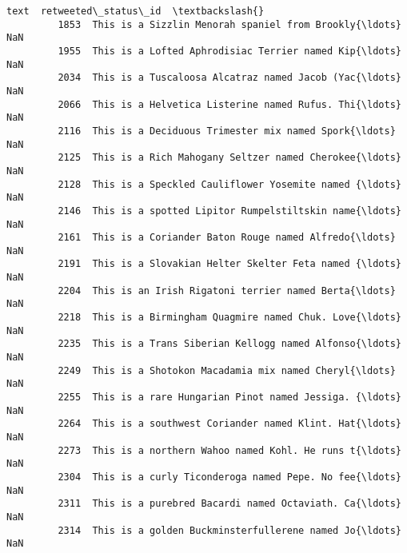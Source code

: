 \documentclass[11pt]{article}
\begin{document}
\begin{Verbatim}[commandchars=\\\{\}]
                                                            text  retweeted\_status\_id  \textbackslash{}
         1853  This is a Sizzlin Menorah spaniel from Brookly{\ldots}                  NaN   
         1955  This is a Lofted Aphrodisiac Terrier named Kip{\ldots}                  NaN   
         2034  This is a Tuscaloosa Alcatraz named Jacob (Yac{\ldots}                  NaN   
         2066  This is a Helvetica Listerine named Rufus. Thi{\ldots}                  NaN   
         2116  This is a Deciduous Trimester mix named Spork{\ldots}                  NaN   
         2125  This is a Rich Mahogany Seltzer named Cherokee{\ldots}                  NaN   
         2128  This is a Speckled Cauliflower Yosemite named {\ldots}                  NaN   
         2146  This is a spotted Lipitor Rumpelstiltskin name{\ldots}                  NaN   
         2161  This is a Coriander Baton Rouge named Alfredo{\ldots}                  NaN   
         2191  This is a Slovakian Helter Skelter Feta named {\ldots}                  NaN   
         2204  This is an Irish Rigatoni terrier named Berta{\ldots}                  NaN   
         2218  This is a Birmingham Quagmire named Chuk. Love{\ldots}                  NaN   
         2235  This is a Trans Siberian Kellogg named Alfonso{\ldots}                  NaN   
         2249  This is a Shotokon Macadamia mix named Cheryl{\ldots}                  NaN   
         2255  This is a rare Hungarian Pinot named Jessiga. {\ldots}                  NaN   
         2264  This is a southwest Coriander named Klint. Hat{\ldots}                  NaN   
         2273  This is a northern Wahoo named Kohl. He runs t{\ldots}                  NaN   
         2304  This is a curly Ticonderoga named Pepe. No fee{\ldots}                  NaN   
         2311  This is a purebred Bacardi named Octaviath. Ca{\ldots}                  NaN   
         2314  This is a golden Buckminsterfullerene named Jo{\ldots}                  NaN   
         

\end{Verbatim}
\end{document}
